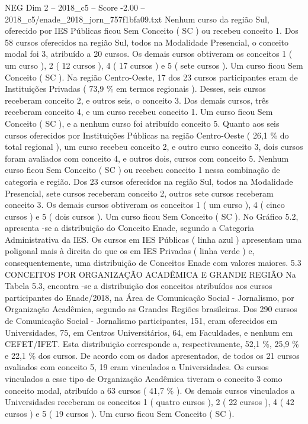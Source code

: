 \begin{textsample}{NEG Dim 2 – 2018\_c5 – Score -2.00 – 2018\_c5/enade\_2018\_jorn\_757f1bfa09.txt}
Nenhum curso da região Sul, oferecido por IES Públicas ficou Sem Conceito ( SC ) ou recebeu conceito 1.
Dos 58 cursos oferecidos na região Sul, todos na Modalidade Presencial, o conceito modal foi 3, atribuído a 20 cursos.
Os demais cursos obtiveram os conceitos 1 ( um curso ), 2 ( 12 cursos ), 4 ( 17 cursos ) e 5 ( sete cursos ).
Um curso ficou Sem Conceito ( SC ).
Na região Centro-Oeste, 17 dos 23 cursos participantes eram de Instituições Privadas ( 73,9 \% em termos regionais ).
Desses, seis cursos receberam conceito 2, e outros seis, o conceito 3.
Dos demais cursos, três receberam conceito 4, e um curso recebeu conceito 1.
Um curso ficou Sem Conceito ( SC ), e a nenhum curso foi atribuído conceito 5.
Quanto aos seis cursos oferecidos por Instituições Públicas na região Centro-Oeste ( 26,1 \% do total regional ), um curso recebeu conceito 2, e outro curso conceito 3, dois cursos foram avaliados com conceito 4, e outros dois, cursos com conceito 5.
Nenhum curso ficou Sem Conceito ( SC ) ou recebeu conceito 1 nessa combinação de categoria e região.
Dos 23 cursos oferecidos na região Sul, todos na Modalidade Presencial, sete cursos receberam conceito 2, outros sete cursos receberam conceito 3.
Os demais cursos obtiveram os conceitos 1 ( um curso ), 4 ( cinco cursos ) e 5 ( dois cursos ).
Um curso ficou Sem Conceito ( SC ).
No Gráfico 5.2, apresenta -se a distribuição do Conceito Enade, segundo a Categoria Administrativa da IES.
Os cursos em IES Públicas ( linha azul ) apresentam uma poligonal mais à direita do que os em IES Privadas ( linha verde ) e, consequentemente, uma distribuição de Conceitos Enade com valores maiores. 5.3 CONCEITOS POR ORGANIZAÇÃO ACADÊMICA E GRANDE REGIÃO Na Tabela 5.3, encontra -se a distribuição dos conceitos atribuídos aos cursos participantes do Enade/2018, na Área de Comunicação Social - Jornalismo, por Organização Acadêmica, segundo as Grandes Regiões brasileiras.
Dos 290 cursos de Comunicação Social - Jornalismo participantes, 151, eram oferecidos em Universidades, 75, em Centros Universitários, 64, em Faculdades, e nenhum em CEFET/IFET.
Esta distribuição corresponde a, respectivamente, 52,1 \%, 25,9 \% e 22,1 \% dos cursos.
De acordo com os dados apresentados, de todos os 21 cursos avaliados com conceito 5, 19 eram vinculados a Universidades.
Os cursos vinculados a esse tipo de Organização Acadêmica tiveram o conceito 3 como conceito modal, atribuído a 63 cursos ( 41,7 \% ).
Os demais cursos vinculados a Universidades receberam os conceitos 1 ( quatro cursos ), 2 ( 22 cursos ), 4 ( 42 cursos ) e 5 ( 19 cursos ).
Um curso ficou Sem Conceito ( SC ).

\end{textsample}
